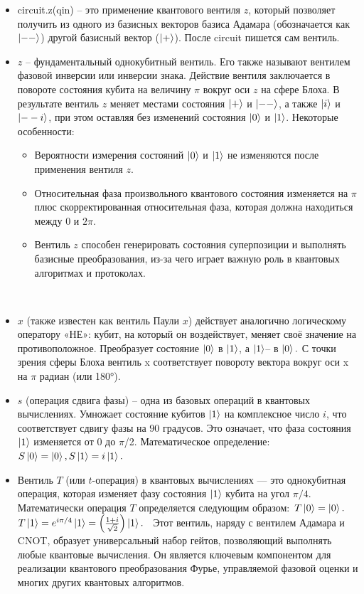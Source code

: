 \documentclass[12pt,a4paper]{article}
\begin{document}
\begin{itemize}
		\item	circuit.z(qin) -- это применение квантового вентиля $z$, который позволяет получить из одного из базисных векторов базиса Адамара (обозначается как $\ket{--}$) другой базисный вектор ($\ket{+}$). После circuit пишется сам вентиль.
		\item	$z$ -- фундаментальный однокубитный вентиль. Его также называют вентилем фазовой инверсии или инверсии знака. Действие вентиля заключается в повороте состояния кубита на величину $\pi$ вокруг оси $z$ на сфере Блоха. В результате вентиль $z$ меняет местами состояния $\ket{+}$ и $\ket{--}$, а также $\ket{i}$ и $\ket{--i}$, при этом оставляя без изменений состояния  $\ket{0}$ и $\ket{1}$.
		Некоторые особенности:
		\begin{itemize}
			\item	Вероятности измерения состояний $\ket{0}$ и $\ket{1}$ не изменяются после применения вентиля $z$.
			\item	Относительная фаза произвольного квантового состояния изменяется на $\pi$ плюс скорректированная относительная фаза, которая должна находиться между $0$ и $2\pi$.
			\item	Вентиль $z$ способен генерировать состояния суперпозиции и выполнять базисные преобразования, из-за чего играет важную роль в квантовых алгоритмах и протоколах.
		\end{itemize}
		\hspace{1em}\\
		\item	$x$ (также известен как вентиль Паули $x$) действует аналогично логическому оператору «НЕ»: кубит, на который он воздействует, меняет своё значение на противоположное. Преобразует состояние $\ket{0}$ в $\ket{1}$, а $\ket{1}$-- в $\ket{0}.$
		С точки зрения сферы Блоха вентиль x соответствует повороту вектора вокруг оси x на $\pi$ радиан (или 180°).
		
		\item		$s$ (операция сдвига фазы) -- одна из базовых операций в квантовых вычислениях.
		Умножает состояние кубитов $\ket{1}$ на комплексное число $i$, что соответствует сдвигу фазы на $90$ градусов. Это означает, что фаза состояния $\ket{1}$ изменяется от 0 до $\pi$/2. Математическое определение: $S \ket{0} = \ket{0}, S \ket{1} = i \ket{1}.$
		
		\item	Вентиль $T$ (или $t$-операция) в квантовых вычислениях --- это однокубитная операция, которая изменяет фазу состояния $\ket{1}$ кубита на угол $\pi/4$. Математически операция $T$ определяется следующим образом:\
		$T \ket{0} = \ket{0}.$ \
		$T \ket{1} = e^{i\pi/4} \ket{1} = \left(\frac{1+i}{\sqrt{2}}\right) \ket{1}.$ \
		Этот вентиль, наряду с вентилем Адамара и CNOT, образует универсальный набор гейтов, позволяющий выполнять любые квантовые вычисления. Он является ключевым компонентом для реализации квантового преобразования Фурье, управляемой фазовой оценки и многих других квантовых алгоритмов.
		
	\end{itemize}
	
\end{document}
